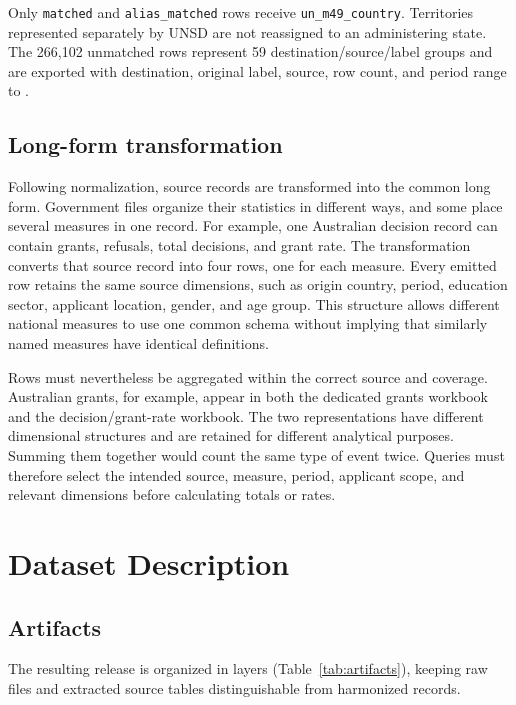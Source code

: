 \documentclass[runningheads]{llncs}
\newcommand{\file}[1]{\path{#1}}
\begin{document}
Only \texttt{matched} and \texttt{alias\_matched} rows receive \texttt{un\_m49\_country}. Territories represented separately by UNSD are not reassigned to an administering state. The 266,102 unmatched rows represent 59 destination/source/label groups and are exported with destination, original label, source, row count, and period range to \file{log/unmatched_origin_labels.csv}.

\subsection{Long-form transformation}

Following normalization, source records are transformed into the common long form. Government files organize their statistics in different ways, and some place several measures in one record. For example, one Australian decision record can contain grants, refusals, total decisions, and grant rate. The transformation converts that source record into four rows, one for each measure. Every emitted row retains the same source dimensions, such as origin country, period, education sector, applicant location, gender, and age group. This structure allows different national measures to use one common schema without implying that similarly named measures have identical definitions.

Rows must nevertheless be aggregated within the correct source and coverage. Australian grants, for example, appear in both the dedicated grants workbook and the decision/grant-rate workbook. The two representations have different dimensional structures and are retained for different analytical purposes. Summing them together would count the same type of event twice. Queries must therefore select the intended source, measure, period, applicant scope, and relevant dimensions before calculating totals or rates.

\section{Dataset Description}

\subsection{Artifacts}

The resulting release is organized in layers (Table~\ref{tab:artifacts}), keeping raw files and extracted source tables distinguishable from harmonized records.
\end{document}
